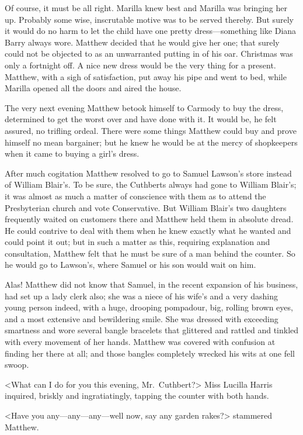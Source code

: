 Of course, it must be all right. Marilla knew best and Marilla was bringing her up. Probably some wise, inscrutable motive was to be served thereby. But surely it would do no harm to let the child have one pretty dress—something like Diana Barry always wore. Matthew decided that he would give her one; that surely could not be objected to as an unwarranted putting in of his oar. Christmas was only a fortnight off. A nice new dress would be the very thing for a present. Matthew, with a sigh of satisfaction, put away his pipe and went to bed, while Marilla opened all the doors and aired the house.

The very next evening Matthew betook himself to Carmody to buy the dress, determined to get the worst over and have done with it. It would be, he felt assured, no trifling ordeal. There were some things Matthew could buy and prove himself no mean bargainer; but he knew he would be at the mercy of shopkeepers when it came to buying a girl's dress.

After much cogitation Matthew resolved to go to Samuel Lawson's store instead of William Blair's. To be sure, the Cuthberts always had gone to William Blair's; it was almost as much a matter of conscience with them as to attend the Presbyterian church and vote Conservative. But William Blair's two daughters frequently waited on customers there and Matthew held them in absolute dread. He could contrive to deal with them when he knew exactly what he wanted and could point it out; but in such a matter as this, requiring explanation and consultation, Matthew felt that he must be sure of a man behind the counter. So he would go to Lawson's, where Samuel or his son would wait on him.

Alas! Matthew did not know that Samuel, in the recent expansion of his business, had set up a lady clerk also; she was a niece of his wife's and a very dashing young person indeed, with a huge, drooping pompadour, big, rolling brown eyes, and a most extensive and bewildering smile. She was dressed with exceeding smartness and wore several bangle bracelets that glittered and rattled and tinkled with every movement of her hands. Matthew was covered with confusion at finding her there at all; and those bangles completely wrecked his wits at one fell swoop.

<What can I do for you this evening, Mr.~Cuthbert?> Miss Lucilla Harris inquired, briskly and ingratiatingly, tapping the counter with both hands.

<Have you any—any—any—well now, say any garden rakes?> stammered Matthew.

